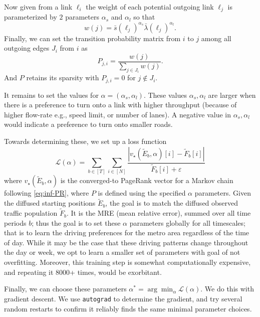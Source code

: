 \documentclass[sigconf, review]{acmart}
\begin{document}
Now given from a link $\ell_i$ the weight of each potential outgoing link $\ell_j$ is parameterized by $2$ parameters $\alpha_s$ and $\alpha_l$ so that
\[
w(j) = \bar s(\ell_j)^{\alpha_s}  \bar \lambda(\ell_j)^{\alpha_l}.
\]
Finally, we can set the transition probability matrix from $i$ to $j$ among all outgoing edges $J_i$ from $i$ as
\[
P_{j,i} = \frac{w(j)}{\sum_{j \in J_i} w(j)}.
\]
And $P$ retains its sparsity with $P_{j,i}=0$ for $j \notin J_i$.  

It remains to set the values for $\alpha = (\alpha_s, \alpha_l)$.  These values $\alpha_s, \alpha_l$ are larger when there is a preference to turn onto a link with higher throughput (because of higher flow-rate e.g., speed limit, or number of lanes).  A negative value in $\alpha_s, \alpha_l$ would indicate a preference to turn onto smaller roads.  

Towards determining these, we set up a loss function 
\[
\mathcal{L}(\alpha) = \sum_{b \in [T]} \sum_{i \in [N]} \frac{| v_\star(\tilde E_b, \alpha)[i] - \tilde F_b[i]| }{\tilde F_b[i] + \varepsilon}
\]
where $v_\star(\tilde E_b, \alpha)$ is the converged-to PageRank vector for a Markov chain following \eqref{eq:inf-PR}, where $P$ is defined using the specified $\alpha$ parameters.  
Given the diffused starting positions $\tilde E_b$, the goal is to match the diffused observed traffic population $\tilde F_b$.  
It is the MRE (mean relative error), summed over all time periods $b$; thus the goal is to set these $\alpha$ parameters globally for all timescales; that is to learn the driving preferences for the metro area regardless of the time of day.    While it may be the case that these driving patterns change throughout the day or week, we opt to learn a smaller set of parameters with goal of not overfitting.  Moreover, this training step is somewhat computationally expensive, and repeating it 8000+ times, would be exorbitant.  

Finally, we can choose these parameters $\alpha^* = \arg \min_{\alpha} \mathcal{L}(\alpha)$.  We do this with gradient descent.  We use \texttt{autograd} to determine the gradient, and try several random restarts to confirm it reliably finds the same minimal parameter choices.  
\end{document}
